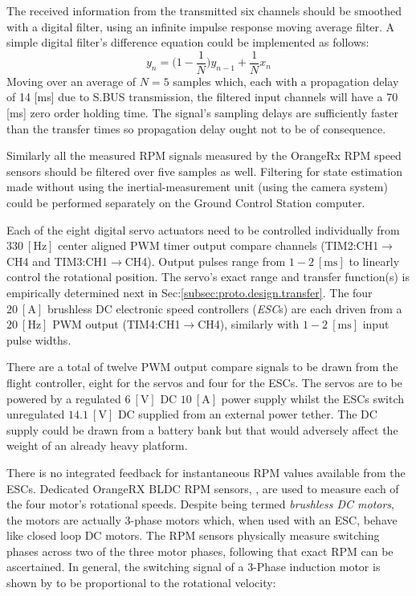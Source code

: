 \par
{\color{red}
The received information from the transmitted six channels should be smoothed with a digital filter, using an infinite impulse response moving average filter. A simple digital filter's difference equation could be implemented as follows: 
\begin{equation}
y_n = \big(1-\frac{1}{N}\big)y_{n-1}+\frac{1}{N}x_n
\end{equation}
Moving over an average of $N=5$ samples which, each with a propagation delay of 14 [ms] due to S.BUS transmission, the filtered input channels will have a 70 [ms] zero order holding time. The signal's sampling delays are sufficiently faster than the transfer times so propagation delay ought not to be of consequence.
\par
Similarly all the measured RPM signals measured by the OrangeRx RPM speed sensors should be filtered over five samples as well. Filtering for state estimation made without using the inertial-measurement unit (using the camera system) could be performed separately on the Ground Control Station computer.}
\par
Each of the eight digital servo actuators need to be controlled individually from $330~[\text{Hz}]$ center aligned PWM timer output compare channels (TIM2:CH1$\rightarrow$CH4 and TIM3:CH1$\rightarrow$CH4). Output pulses range from $1-2~[\text{ms}]$ to linearly control the rotational position. The servo's exact range and transfer function(s) is empirically determined next in Sec:\ref{subsec:proto.design.transfer}. The four $20~[\text{A}]$ brushless DC electronic speed controllers (\emph{ESC}s) are each driven from a $20~[\text{Hz}]$ PWM output (TIM4:CH1$\rightarrow$CH4), similarly with $1-2~[\text{ms}]$ input pulse widths. 
\par
There are a total of twelve PWM output compare signals to be drawn from the flight controller, eight for the servos and four for the ESCs. The servos are to be powered by a regulated $6~[\text{V}]$ DC $10~[\text{A}]$ power supply \cite{rotorstar} whilst the ESCs switch unregulated $14.1~[\text{V}]$ DC supplied from an external power tether. The DC supply could be drawn from a battery bank but that would adversely affect the weight of an already heavy platform.
\par
There is no integrated feedback for instantaneous RPM values available from the ESCs. Dedicated OrangeRX BLDC RPM sensors, \cite{orangerpm}, are used to measure each of the four motor's rotational speeds. Despite being termed \emph{brushless DC motors}, the motors are actually 3-phase motors which, when used with an ESC, behave like closed loop DC motors. The RPM sensors physically measure switching phases across two of the three motor phases, following that exact RPM can be ascertained. In general, the switching signal of a 3-Phase induction motor is shown by \cite{vfd} to be proportional to the rotational velocity:
